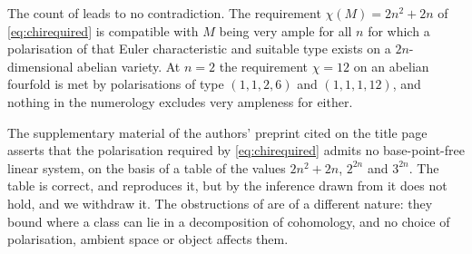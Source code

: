 \begin{corollary}\label{cor:nonumerical}
The count of  leads to no contradiction. The
requirement $\chi(M)=2n^{2}+2n$ of \eqref{eq:chirequired} is compatible with
$M$ being very ample for all $n$ for which a polarisation of that Euler
characteristic and suitable type exists on a $2n$-dimensional abelian
variety. At $n=2$ the requirement $\chi=12$ on an abelian fourfold is met by
polarisations of type $(1,1,2,6)$ and $(1,1,1,12)$, and nothing in the
numerology excludes very ampleness for either.
\end{corollary}

\begin{remark}\label{rem:retract}
The supplementary material of the authors' preprint cited on the title page
asserts that the polarisation required by \eqref{eq:chirequired} admits no
base-point-free linear system, on the basis of a table of the values
$2n^{2}+2n$, $2^{2n}$ and $3^{2n}$. The table is correct, and
 reproduces it, but by  the
inference drawn from it does not hold, and we withdraw it. The obstructions of
 are of a different nature: they bound where
a class can lie in a decomposition of cohomology, and no choice of
polarisation, ambient space or object affects them.
\end{remark}
